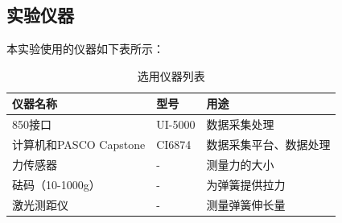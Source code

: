 \documentclass[a4paper,zihao=5,UTF8,fontset=fandol]{../phyreport}
\begin{document}
\subsection{实验仪器}
本实验使用的仪器如下表所示：
\begin{table}[H]
	\centering
	\caption{选用仪器列表} \label{仪器列表}%
	\begin{tabular}{lll}
		\toprule
		仪器名称               & 型号      & 用途          \\
		\midrule
		850接口              & UI-5000 & 数据采集处理      \\
		计算机和PASCO Capstone & CI6874  & 数据采集平台、数据处理 \\
		力传感器               & -       & 测量力的大小      \\
		砝码（10-1000g）    & -       & 为弹簧提供拉力     \\
		激光测距仪              & -       & 测量弹簧伸长量     \\
		\bottomrule
	\end{tabular}
\end{table}
\longLine
\end{document}
